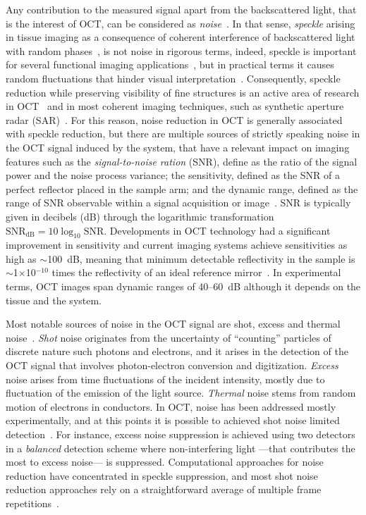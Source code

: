 Any contribution to the measured signal apart from the backscattered light, that is the interest of OCT, can be considered as \textit{noise}~\cite{Izatt2015_Theory}. In that sense, \textit{speckle} arising in tissue imaging as a consequence of coherent interference of backscattered light with random phases~\cite{Goodman2007_Speckle}, is not noise in rigorous terms, indeed, speckle is important for several functional imaging applications~\cite{Wang2007_Three, Lee2012_Dynamic, Liu2013_Quantitative}, but in practical terms it causes random fluctuations that hinder visual interpretation~\cite{Schmitt1999_Speckle}. Consequently, speckle reduction while preserving visibility of fine structures is an active area of research in OCT~\cite{Cuartas-Velez2018_Volumetric} and in most coherent imaging techniques, such as synthetic aperture radar (SAR)~\cite{Argenti2013_Tutorial}. For this reason, noise reduction in OCT is generally associated with speckle reduction, but there are multiple sources of strictly speaking noise in the OCT signal induced by the system, that have a relevant impact on imaging features such as the \textit{signal-to-noise ration} (SNR), define as the ratio of the signal power and the noise process variance; the sensitivity, defined as the SNR of a perfect reflector placed in the sample arm; and the dynamic range, defined as the range of SNR observable within a signal acquisition or image~\cite{Izatt2015_Theory, deBoer2003_Improved}. SNR is typically given in decibels (dB) through the logarithmic transformation $\text{SNR}_{\text{dB}} = 10\log_{10}\text{SNR}$. Developments in OCT technology had a significant improvement in sensitivity and current imaging systems achieve sensitivities as high as $\sim$100~dB, meaning that minimum detectable reflectivity in the sample is $\sim$1$\times$10$^{-10}$ times the reflectivity of an ideal reference mirror~\cite{Izatt2015_Theory}. In experimental terms, OCT images span dynamic ranges of 40--60~dB although it depends on the tissue and the system.

Most notable sources of noise in the OCT signal are shot, excess and thermal noise~\cite{deBoer2003_Improved}. \textit{Shot} noise originates from the uncertainty of ``counting'' particles of discrete nature such photons and electrons, and it arises in the detection of the OCT signal that involves photon-electron conversion and digitization. \textit{Excess} noise arises from time fluctuations of the incident intensity, mostly due to fluctuation of the emission of the light source. \textit{Thermal} noise stems from random motion of electrons in conductors. In OCT, noise has been addressed mostly experimentally, and at this points it is possible to achieved shot noise limited detection~\cite{deBoer2003_Improved}. For instance, excess noise suppression is achieved using two detectors in a \textit{balanced} detection scheme where non-interfering light ---that contributes the most to excess noise--- is suppressed. Computational approaches for noise reduction have concentrated in speckle suppression, and most shot noise reduction approaches rely on a straightforward average of multiple frame repetitions~\cite{Baumann2019_Signal}.

